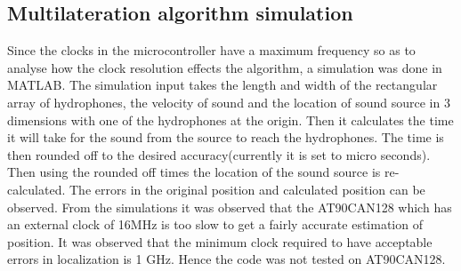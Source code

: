 \subsection{Multilateration algorithm simulation}
Since the clocks in the microcontroller have a maximum frequency so as to analyse how the clock resolution effects the algorithm, a simulation was done in MATLAB. The simulation input takes the length and width of the rectangular array of hydrophones, the velocity of sound and the location of sound source in 3 dimensions with one of the hydrophones at the origin. Then it calculates the time it will take for the sound from the source to reach the hydrophones. The time is then rounded off to the desired accuracy(currently it is set to micro seconds). Then using the rounded off times the location of the sound source is re-calculated. The errors in the original position and calculated position can be observed.\newline
From the simulations it was observed that the AT90CAN128 which has an external clock of 16MHz is too slow to get a fairly accurate estimation of position. It was observed that the minimum clock required to have acceptable errors in localization is 1 GHz. Hence the code was not tested on AT90CAN128.
%